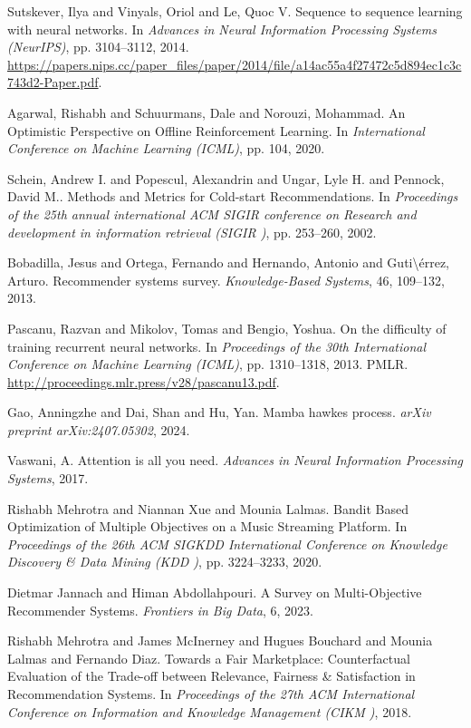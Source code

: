 \begin{thebibliography}{99}
 Sutskever, Ilya and Vinyals, Oriol and Le, Quoc V. {S}equence to sequence learning with neural networks. In \textit{Advances in Neural Information Processing Systems (NeurIPS)}, pp. 3104--3112, 2014. \url{https://papers.nips.cc/paper\_files/paper/2014/file/a14ac55a4f27472c5d894ec1c3c743d2-Paper.pdf}.

 Agarwal, Rishabh and Schuurmans, Dale and Norouzi, Mohammad. {A}n {O}ptimistic {P}erspective on {O}ffline {R}einforcement {L}earning. In \textit{International Conference on Machine Learning (ICML)}, pp. 104, 2020.

 Schein, Andrew I. and Popescul, Alexandrin and Ungar, Lyle H. and Pennock, David M.. {M}ethods and {M}etrics for {C}old-start {R}ecommendations. In \textit{Proceedings of the 25th annual international ACM SIGIR conference on Research and development in information retrieval (SIGIR )}, pp. 253--260, 2002.

 Bobadilla, Jesus and Ortega, Fernando and Hernando, Antonio and Guti\textbackslash {\'e}rrez, Arturo. {R}ecommender systems survey. \textit{Knowledge-Based Systems}, 46, 109--132, 2013.

 Pascanu, Razvan and Mikolov, Tomas and Bengio, Yoshua. {O}n the difficulty of training recurrent neural networks. In \textit{Proceedings of the 30th International Conference on Machine Learning (ICML)}, pp. 1310--1318, 2013. PMLR. \url{http://proceedings.mlr.press/v28/pascanu13.pdf}.

 Gao, Anningzhe and Dai, Shan and Hu, Yan. {M}amba hawkes process. \textit{arXiv preprint arXiv:2407.05302}, 2024.

 Vaswani, A. {A}ttention is all you need. \textit{Advances in Neural Information Processing Systems}, 2017.

 Rishabh Mehrotra and Niannan Xue and Mounia Lalmas. {B}andit {B}ased {O}ptimization of {M}ultiple {O}bjectives on a {M}usic 
{S}treaming {P}latform. In \textit{Proceedings of the 26th ACM SIGKDD International Conference on 
Knowledge Discovery \& Data Mining (KDD )}, pp. 3224--3233, 2020.

 Dietmar Jannach and Himan Abdollahpouri. {A} Survey on {M}ulti-{O}bjective {R}ecommender {S}ystems. \textit{Frontiers in Big Data}, 6, 2023.

 Rishabh Mehrotra and James McInerney and Hugues Bouchard and  Mounia Lalmas and Fernando Diaz. {T}owards a {F}air {M}arketplace: {C}ounterfactual {E}valuation of the 
{T}rade-off between {R}elevance, {F}airness \& {S}atisfaction in 
{R}ecommendation {S}ystems. In \textit{Proceedings of the 27th ACM International Conference on Information 
and Knowledge Management (CIKM )}, 2018.


\end{thebibliography}
